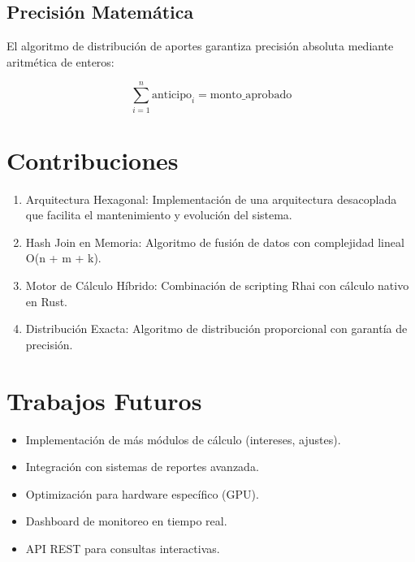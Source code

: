 \bigskip

\subsection{Precisión Matemática}

El algoritmo de distribución de aportes garantiza precisión absoluta mediante aritmética de enteros:

\[
\sum_{i=1}^{n} \text{anticipo}_i = \text{monto\_aprobado}
\]

\bigskip

\section{Contribuciones}

\bigskip

\begin{enumerate}
    \item Arquitectura Hexagonal: Implementación de una arquitectura desacoplada que facilita el mantenimiento y evolución del sistema.
    \item Hash Join en Memoria: Algoritmo de fusión de datos con complejidad lineal O(n + m + k).
    \item Motor de Cálculo Híbrido: Combinación de scripting Rhai con cálculo nativo en Rust.
    \item Distribución Exacta: Algoritmo de distribución proporcional con garantía de precisión.
\end{enumerate}

\bigskip

\section{Trabajos Futuros}

\bigskip

\begin{itemize}
    \item Implementación de más módulos de cálculo (intereses, ajustes).
    \item Integración con sistemas de reportes avanzada.
    \item Optimización para hardware específico (GPU).
    \item Dashboard de monitoreo en tiempo real.
    \item API REST para consultas interactivas.
\end{itemize}

\bigskip


